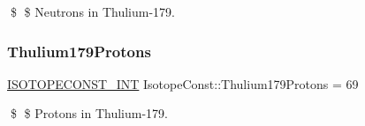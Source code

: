 \$ \$ Neutrons in Thulium-\/179. \mbox{\label{group___isotope_const-_thulium-_tm179_gaab689857f6233827091c7c60baaeaeb5}} 
\subsubsection{\texorpdfstring{Thulium179\+Protons}{Thulium179Protons}}
{\footnotesize\ttfamily \mbox{\hyperlink{group___isotope_const-_macros_ga5f18360b3e99483a35c32d789e62621c}{I\+S\+O\+T\+O\+P\+E\+C\+O\+N\+S\+T\+\_\+\+I\+NT}} Isotope\+Const\+::\+Thulium179\+Protons = 69}

\$ \$ Protons in Thulium-\/179. 